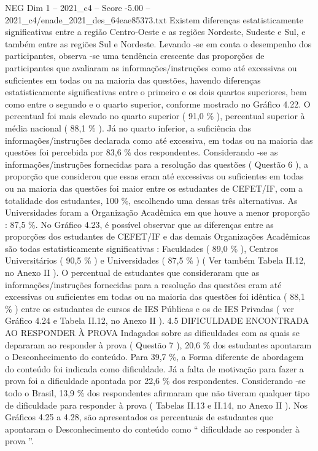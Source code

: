 \begin{textsample}{NEG Dim 1 – 2021\_c4 – Score -5.00 – 2021\_c4/enade\_2021\_des\_64eae85373.txt}
Existem diferenças estatisticamente significativas entre a região Centro-Oeste e as regiões Nordeste, Sudeste e Sul, e também entre as regiões Sul e Nordeste.
Levando -se em conta o desempenho dos participantes, observa -se uma tendência crescente das proporções de participantes que avaliaram as informações/instruções como até excessivas ou suficientes em todas ou na maioria das questões, havendo diferenças estatisticamente significativas entre o primeiro e os dois quartos superiores, bem como entre o segundo e o quarto superior, conforme mostrado no Gráfico 4.22.
O percentual foi mais elevado no quarto superior ( 91,0 \% ), percentual superior à média nacional ( 88,1 \% ).
Já no quarto inferior, a suficiência das informações/instruções declarada como até excessiva, em todas ou na maioria das questões foi percebida por 83,6 \% dos respondentes.
Considerando -se as informações/instruções fornecidas para a resolução das questões ( Questão 6 ), a proporção que considerou que essas eram até excessivas ou suficientes em todas ou na maioria das questões foi maior entre os estudantes de CEFET/IF, com a totalidade dos estudantes, 100 \%, escolhendo uma dessas três alternativas.
As Universidades foram a Organização Acadêmica em que houve a menor proporção : 87,5 \%.
No Gráfico 4.23, é possível observar que as diferenças entre as proporções dos estudantes de CEFET/IF e das demais Organizações Acadêmicas são todas estatisticamente significativas : Faculdades ( 89,0 \% ), Centros Universitários ( 90,5 \% ) e Universidades ( 87,5 \% ) ( Ver também Tabela II.12, no Anexo II ).
O percentual de estudantes que consideraram que as informações/instruções fornecidas para a resolução das questões eram até excessivas ou suficientes em todas ou na maioria das questões foi idêntica ( 88,1 \% ) entre os estudantes de cursos de IES Públicas e os de IES Privadas ( ver Gráfico 4.24 e Tabela II.12, no Anexo II ). 4.5 DIFICULDADE ENCONTRADA AO RESPONDER À PROVA Indagados sobre as dificuldades com as quais se depararam ao responder à prova ( Questão 7 ), 20,6 \% dos estudantes apontaram o Desconhecimento do conteúdo.
Para 39,7 \%, a Forma diferente de abordagem do conteúdo foi indicada como dificuldade.
Já a falta de motivação para fazer a prova foi a dificuldade apontada por 22,6 \% dos respondentes.
Considerando -se todo o Brasil, 13,9 \% dos respondentes afirmaram que não tiveram qualquer tipo de dificuldade para responder à prova ( Tabelas II.13 e II.14, no Anexo II ).
Nos Gráficos 4.25 a 4.28, são apresentados os percentuais de estudantes que apontaram o Desconhecimento do conteúdo como “ dificuldade ao responder à prova ”.

\end{textsample}
